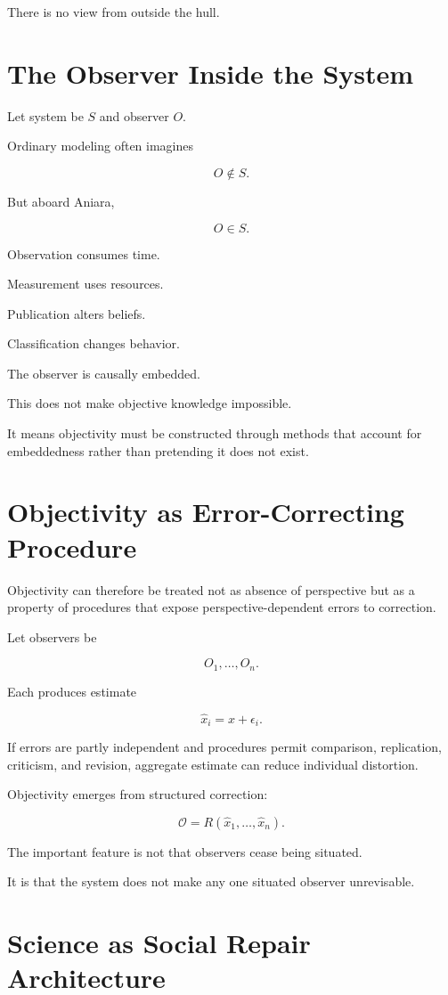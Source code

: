 \documentclass[11pt,oneside]{book}
\theoremstyle{definition}
\theoremstyle{remark}
\begin{document}
There is no view from outside the hull.

\section{The Observer Inside the System}

Let system be \(S\) and observer \(O\).

Ordinary modeling often imagines

\[
O\notin S.
\]

But aboard Aniara,

\[
O\in S.
\]

Observation consumes time.

Measurement uses resources.

Publication alters beliefs.

Classification changes behavior.

The observer is causally embedded.

This does not make objective knowledge impossible.

It means objectivity must be constructed through methods that account for embeddedness rather than pretending it does not exist.

\section{Objectivity as Error-Correcting Procedure}

Objectivity can therefore be treated not as absence of perspective but as a property of procedures that expose perspective-dependent errors to correction.

Let observers be

\[
O_1,\ldots,O_n.
\]

Each produces estimate

\[
\hat{x}_i=x+\epsilon_i.
\]

If errors are partly independent and procedures permit comparison, replication, criticism, and revision, aggregate estimate can reduce individual distortion.

Objectivity emerges from structured correction:

\[
\mathcal O
=
R(
\hat{x}_1,\ldots,\hat{x}_n
).
\]

The important feature is not that observers cease being situated.

It is that the system does not make any one situated observer unrevisable.

\section{Science as Social Repair Architecture}
\end{document}
